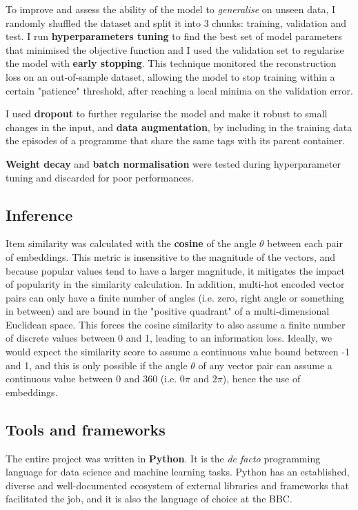 To improve and assess the ability of the model to \textit{generalise} on unseen data, I randomly shuffled the dataset and split
it into 3 chunks: training, validation and test. I run \textbf{hyperparameters tuning} to find the best set of model parameters
that minimised the objective function and I used the validation set to regularise the model with \textbf{early stopping}.
This technique monitored the reconstruction loss on an out-of-sample dataset,
allowing the model to stop training within a certain "patience" threshold, after reaching a local minima on the validation error.

I used \textbf{dropout} to further regularise the model and make it robust to small changes in the input,
and \textbf{data augmentation}, by including in the training data the episodes of a programme that share the same tags with its
parent container.

\textbf{Weight decay} and \textbf{batch normalisation} were tested during hyperparameter tuning and discarded for poor performances.%

\subsection{Inference}

Item similarity was calculated with the \textbf{cosine} of the angle $\theta$ between each pair of embeddings. This metric
is insensitive to the magnitude of the vectors, and because popular values tend to have a larger magnitude, it mitigates the impact of
popularity in the similarity calculation. In addition, multi-hot encoded vector pairs can only have a finite number of angles
(i.e. zero, right angle or something in between) and are bound in the "positive quadrant" of a multi-dimensional Euclidean space.
This forces the cosine similarity to also assume a finite number of discrete values between 0 and 1, leading to an information
loss. Ideally, we would expect the similarity score to assume a continuous value bound between -1 and 1, and this
is only possible if the angle $\theta$ of any vector pair can assume a continuous value between 0 and 360 (i.e. $0\pi$ and $2\pi$), hence
the use of embeddings.

\subsection{Tools and frameworks}

The entire project was written in \textbf{Python}. It is the \textit{de facto} programming language for data science
and machine learning tasks. Python has an established, diverse and well-documented ecosystem of external libraries
and frameworks that facilitated the job, and it is also the language of choice at the BBC.

